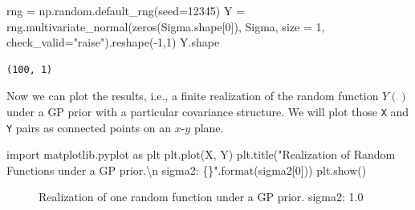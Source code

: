 \documentclass[
  letterpaper,
  DIV=11,
  numbers=noendperiod]{scrreprt}
\newenvironment{Shaded}{\begin{snugshade}}{\end{snugshade}}
\newcommand{\BuiltInTok}[1]{\textcolor[rgb]{0.00,0.23,0.31}{#1}}
\newcommand{\CharTok}[1]{\textcolor[rgb]{0.13,0.47,0.30}{#1}}
\newcommand{\DecValTok}[1]{\textcolor[rgb]{0.68,0.00,0.00}{#1}}
\newcommand{\ImportTok}[1]{\textcolor[rgb]{0.00,0.46,0.62}{#1}}
\newcommand{\NormalTok}[1]{\textcolor[rgb]{0.00,0.23,0.31}{#1}}
\newcommand{\OperatorTok}[1]{\textcolor[rgb]{0.37,0.37,0.37}{#1}}
\newcommand{\SpecialCharTok}[1]{\textcolor[rgb]{0.37,0.37,0.37}{#1}}
\newcommand{\StringTok}[1]{\textcolor[rgb]{0.13,0.47,0.30}{#1}}
\begin{document}
\begin{Shaded}
\begin{Highlighting}[]
\NormalTok{rng }\OperatorTok{=}\NormalTok{ np.random.default\_rng(seed}\OperatorTok{=}\DecValTok{12345}\NormalTok{)}
\NormalTok{Y }\OperatorTok{=}\NormalTok{ rng.multivariate\_normal(zeros(Sigma.shape[}\DecValTok{0}\NormalTok{]), Sigma, size }\OperatorTok{=} \DecValTok{1}\NormalTok{, check\_valid}\OperatorTok{=}\StringTok{"raise"}\NormalTok{).reshape(}\OperatorTok{{-}}\DecValTok{1}\NormalTok{,}\DecValTok{1}\NormalTok{)}
\NormalTok{Y.shape}
\end{Highlighting}
\end{Shaded}

\begin{verbatim}
(100, 1)
\end{verbatim}

Now we can plot the results, i.e., a finite realization of the random
function \(Y()\) under a GP prior with a particular covariance
structure. We will plot those \texttt{X} and \texttt{Y} pairs as
connected points on an \(x\)-\(y\) plane.

\begin{Shaded}
\begin{Highlighting}[]
\ImportTok{import}\NormalTok{ matplotlib.pyplot }\ImportTok{as}\NormalTok{ plt}
\NormalTok{plt.plot(X, Y)}
\NormalTok{plt.title(}\StringTok{"Realization of Random Functions under a GP prior.}\CharTok{\textbackslash{}n}\StringTok{ sigma2: }\SpecialCharTok{\{\}}\StringTok{"}\NormalTok{.}\BuiltInTok{format}\NormalTok{(sigma2[}\DecValTok{0}\NormalTok{]))}
\NormalTok{plt.show()}
\end{Highlighting}
\end{Shaded}

\begin{figure}[H]


\caption{\label{fig-mvn1-1}Realization of one random function under a GP
prior. sigma2: 1.0}

\end{figure}%
\end{document}
